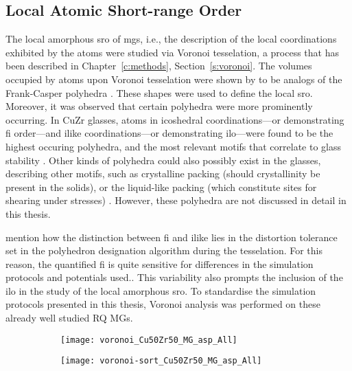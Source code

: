 \subsection{Local Atomic Short-range Order} \label{s:voro-mgs}
The local amorphous \gls{sro} of \gls{mg}s, i.e., the description of the local coordinations exhibited by the atoms were studied via Voronoi tesselation, a process that has been described in Chapter~\ref{c:methods},  Section~\ref{s:voronoi}. %
The volumes occupied by atoms upon Voronoi tesselation were shown by \textcite{Sheng2006} to be analogs of the Frank-Casper polyhedra \cite{Frank1958}. These shapes were used to define the local \gls{sro}. Moreover, it was observed that certain polyhedra were more prominently occurring. In CuZr glasses, atoms in icoshedral coordinations---or demonstrating \gls{fi} order---and \gls{ilike} coordinations---or demonstrating \gls{ilo}---were found to be the highest occuring polyhedra, and the most relevant motifs that correlate to glass stability \cite{Ding2014,Yue2018}. Other kinds of polyhedra could also possibly exist in the glasses, describing other motifs, such as crystalline packing (should crystallinity be present in the solids), or the liquid-like packing (which constitute sites for shearing under stresses) \cite{Ding2014,Cheng2009}. However, these polyhedra are not discussed in detail in this thesis. \par

\textcite{Ding2014} mention how the distinction between \gls{fi} and \gls{ilike} lies in the distortion tolerance set in the polyhedron designation algorithm during the tesselation. For this reason, the quantified \gls{fi} is quite sensitive for differences in the simulation protocols and potentials used.\cite{Adibi2014,Avchaciov2013, Lu2018, Li2009a}. This variability also prompts the inclusion of the \gls{ilo} in the study of the local amorphous \gls{sro}. To standardise the simulation protocols presented in this thesis, Voronoi analysis was performed on these already well studied RQ MGs. \par

\begin{changebar}
\begin{figure}[h] %
	\centering
	\begin{subfigure}{0.45\linewidth} \centering \texttt{[image: voronoi\_Cu50Zr50\_MG\_asp\_All]}
		\subcaption{} \end{subfigure}%
	\begin{subfigure}{0.45\linewidth} \centering \texttt{[image: voronoi-sort\_Cu50Zr50\_MG\_asp\_All]}
		\subcaption{} \end{subfigure}
	\label{f:voro_qr}
\end{figure}
\end{changebar}


